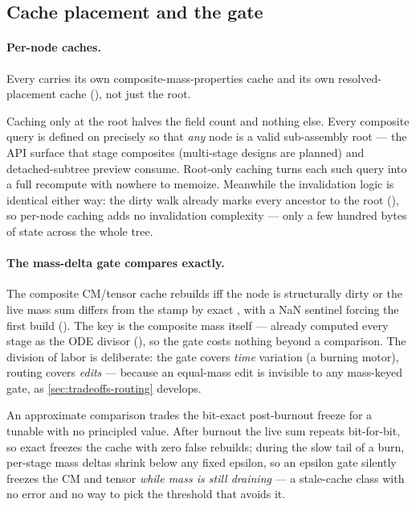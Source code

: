 \subsection{Cache placement and the gate}\label{sec:tradeoffs-caching}

\paragraph{Per-node caches.}
Every  carries its own composite-mass-properties cache and its own
resolved-placement cache (), not just the root.

\begin{rejected}
Caching only at the root halves the field count and nothing else. Every composite query
is defined on  precisely so that \emph{any} node is a valid sub-assembly
root --- the API surface that stage composites (multi-stage designs are planned) and
detached-subtree preview consume. Root-only caching turns each such query into a full
recompute with nowhere to memoize. Meanwhile the invalidation logic is identical either
way: the dirty walk already marks every ancestor to the root
(), so per-node caching adds no invalidation complexity ---
only a few hundred bytes of  state across the whole tree.
\end{rejected}

\paragraph{The mass-delta gate compares exactly.}
The composite CM/tensor cache rebuilds iff the node is structurally dirty or the live
mass sum differs from the stamp by exact \code{==}, with a NaN sentinel forcing the first
build (). The key is the composite mass itself ---
already computed every stage as the ODE divisor (), so
the gate costs nothing beyond a comparison. The division of labor is deliberate: the gate
covers \emph{time} variation (a burning motor), routing covers \emph{edits} --- because
an equal-mass edit is invisible to any mass-keyed gate, as
\cref{sec:tradeoffs-routing} develops.

\begin{rejected}
An approximate comparison trades the bit-exact post-burnout freeze for a tunable with no
principled value. After burnout the live sum repeats bit-for-bit, so exact \code{==}
freezes the cache with zero false rebuilds; during the slow tail of a burn, per-stage
mass deltas shrink below any fixed epsilon, so an epsilon gate silently freezes the CM
and tensor \emph{while mass is still draining} --- a stale-cache class with no error and
no way to pick the threshold that avoids it.
\end{rejected}

